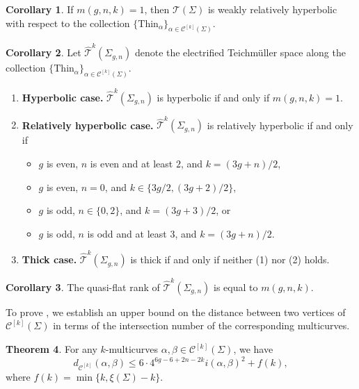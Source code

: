 \documentclass[a4paper,11pt]{amsart}
\numberwithin{equation}{section}
\theoremstyle{definition}
\newtheorem{theorema}{Theorem}
\newtheorem{corollarya}[theorema]{Corollary}
\newcommand{\Teich}{\mathcal{T}}
\newcommand{\elTeich}{\hat{\mathcal{T}}}
\newcommand{\Thin}{\mathrm{Thin}}
\newcommand{\multicurve}[1]{\mathcal{C}^{[#1]}}
\begin{document}
\begin{corollarya}
If $m(g,n,k)=1$, then $\Teich(\Sigma)$ is weakly relatively hyperbolic with respect to the collection $\{\Thin_\alpha\}_{\alpha\in\multicurve{k}(\Sigma)}$.
\end{corollarya}

\begin{corollarya}\label{corollaryC}
    Let $\elTeich^k(\Sigma_{g,n})$ denote the electrified Teichmüller space along the collection $\{\Thin_\alpha\}_{\alpha\in\multicurve{k}(\Sigma)}$.
    \begin{enumerate}
        \item \textbf{Hyperbolic case.} 
        $\elTeich^k(\Sigma_{g,n})$ is hyperbolic if and only if $m(g,n,k)=1$.
        \item \textbf{Relatively hyperbolic case.} $\elTeich^k(\Sigma_{g,n})$ is relatively hyperbolic if and only if 
        \begin{itemize}
            \item $g$ is even, $n$ is even and at least $2$, and $k=(3g+n)/2$,
            \item $g$ is even, $n=0$, and $k\in\{3g/2,(3g+2)/2\}$,
            \item $g$ is odd, $n\in\{0,2\}$, and $k=(3g+3)/2$, or 
            \item $g$ is odd, $n$ is odd and at least $3$, and $k=(3g+n)/2$.
        \end{itemize}
        \item \textbf{Thick case.} $\elTeich^k(\Sigma_{g,n})$ is thick if and only if neither (1) nor (2) holds.
    \end{enumerate} 
\end{corollarya}

\begin{corollarya}
    The quasi-flat rank of $\elTeich^k(\Sigma_{g,n})$ is equal to $m(g,n,k)$.
\end{corollarya}

To prove , we establish an upper bound on the distance between two vertices of $\multicurve{k}(\Sigma)$ in terms of the intersection number of the corresponding multicurves.
\begin{theorema}\label{theorema:E}
    For any $k$-multicurves $\alpha,\beta\in\multicurve{k}(\Sigma)$, we have 
    \begin{equation*}
        d_{\multicurve{k}}(\alpha,\beta)\leq 6\cdot 4^{6g-6+2n-2k}i(\alpha,\beta)^2+f(k),
    \end{equation*}
    where $f(k)=\min\{k,\xi(\Sigma)-k\}$.
\end{theorema}
\end{document}
